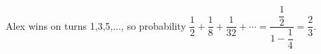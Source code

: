 Alex wins on turns 1,3,5,..., so probability $\dfrac{1}{2}+\dfrac{1}{8}+\dfrac{1}{32}+\cdots=\dfrac{\dfrac{1}{2}}{1-\dfrac{1}{4}}=\boxed{\dfrac{2}{3}}$.
